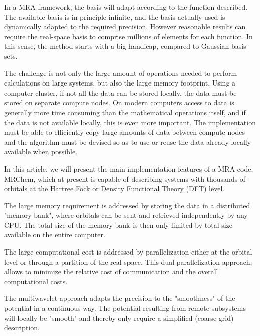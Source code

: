 \documentclass{article}
\begin{document}
In a MRA framework, the basis will adapt according to the function described. The available basis is in principle infinite, and the basis actually used is dynamically adapted to the required precision. However reasonable results can require the real-space basis to comprise millions of elements for each function. In this sense, the method starts with a big handicap, compared to Gaussian basis sets.

The challenge is not only the large amount of operations needed to perform calculations on large systems, but also the large memory footprint. Using a computer cluster, if not all the data can be stored locally, the data must be stored on separate compute nodes. On modern computers access to data is generally more time consuming than the mathematical operations itself, and if the data is not available locally, this is even more important. The implementation must be able to efficiently copy large amounts of data between compute nodes and the algorithm must be devised so as to use or reuse the data already locally available when possible.


In this article, we will present the main implementation features of a MRA code, MRChem, which at present is capable of describing systems with thousands of orbitals at the Hartree Fock or Density Functional Theory (DFT) level.  

The large memory requirement is addressed by storing the data in a distributed "memory bank", where orbitals can be sent and retrieved independently by any CPU. The total size of the memory bank is then only limited by total size available on the entire computer.

The large computational cost is addressed by parallelization either at the orbital level or through a partition of the real space. This  dual parallelization approach, allows to minimize the relative cost of communication and the overall computational costs.

The multiwavelet approach adapts the precision to the "smoothness" of the potential in a continuous way. The potential resulting from remote subsystems will locally be "smooth" and thereby only require a simplified (coarse grid) description. 
\end{document}
